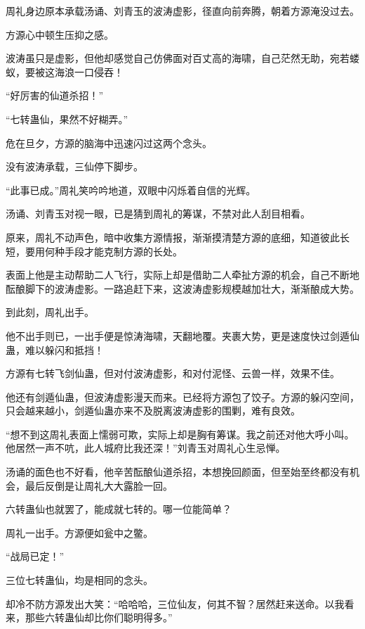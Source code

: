 
\begin{this_body}



周礼身边原本承载汤诵、刘青玉的波涛虚影，径直向前奔腾，朝着方源淹没过去。

方源心中顿生压抑之感。

波涛虽只是虚影，但他却感觉自己仿佛面对百丈高的海啸，自己茫然无助，宛若蝼蚁，要被这海浪一口侵吞！

“好厉害的仙道杀招！”

“七转蛊仙，果然不好糊弄。”

危在旦夕，方源的脑海中迅速闪过这两个念头。

没有波涛承载，三仙停下脚步。

“此事已成。”周礼笑吟吟地道，双眼中闪烁着自信的光辉。

汤诵、刘青玉对视一眼，已是猜到周礼的筹谋，不禁对此人刮目相看。

原来，周礼不动声色，暗中收集方源情报，渐渐摸清楚方源的底细，知道彼此长短，要用何种手段才能克制方源的长处。

表面上他是主动帮助二人飞行，实际上却是借助二人牵扯方源的机会，自己不断地酝酿脚下的波涛虚影。一路追赶下来，这波涛虚影规模越加壮大，渐渐酿成大势。

到此刻，周礼出手。

他不出手则已，一出手便是惊涛海啸，天翻地覆。夹裹大势，更是速度快过剑遁仙蛊，难以躲闪和抵挡！

方源有七转飞剑仙蛊，但对付波涛虚影，和对付泥怪、云兽一样，效果不佳。

他还有剑遁仙蛊，但波涛虚影漫天而来。已经将方源包了饺子。方源的躲闪空间，只会越来越小，剑遁仙蛊亦来不及脱离波涛虚影的围剿，难有良效。

“想不到这周礼表面上懦弱可欺，实际上却是胸有筹谋。我之前还对他大呼小叫。他居然一声不吭，此人城府比我还深！”刘青玉对周礼心生忌惮。

汤诵的面色也不好看，他辛苦酝酿仙道杀招，本想挽回颜面，但至始至终都没有机会，最后反倒是让周礼大大露脸一回。

六转蛊仙也就罢了，能成就七转的。哪一位能简单？

周礼一出手。方源便如瓮中之鳖。

“战局已定！”

三位七转蛊仙，均是相同的念头。

却冷不防方源发出大笑：“哈哈哈，三位仙友，何其不智？居然赶来送命。以我看来，那些六转蛊仙却比你们聪明得多。”


\end{this_body}
